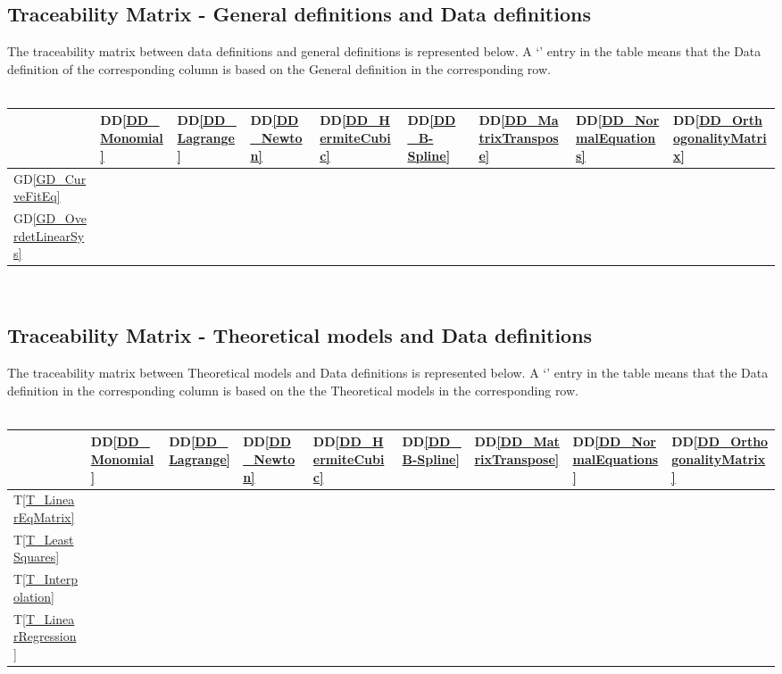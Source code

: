 \documentclass[12pt]{article}
\newcommand{\dref}[1]{GD\ref{#1}}
\newcommand{\ddref}[1]{DD\ref{#1}}
\newcommand{\tref}[1]{T\ref{#1}}
\begin{document}
\subsection{Traceability Matrix - General definitions and Data definitions}
The traceability matrix between data definitions and general definitions is represented below. A `\checkmark' entry in the table means that the Data definition of the corresponding column is based on the General definition in the corresponding row.\\
~\newline
\begin{tabular}{|p{1.3cm}|p{1cm}|p{1cm}|p{1cm}|p{1cm}|p{1cm}|p{1cm}|p{1cm}|p{1cm}|}
	
	\hline
	 & \ddref{DD_Monomial} & \ddref{DD_Lagrange} & \ddref{DD_Newton} & \ddref{DD_HermiteCubic} & \ddref{DD_B-Spline} & \ddref{DD_MatrixTranspose}  & \ddref{DD_NormalEquations} & \ddref{DD_OrthogonalityMatrix}\\
	 \hline
	 \dref{GD_CurveFitEq} & \checkmark & \checkmark  & \checkmark  & \checkmark  & \checkmark  & \checkmark   & \checkmark & \checkmark\\
	  \hline
	 \dref{GD_OverdetLinearSys} &  &   &   &   &   & \checkmark   & \checkmark & \checkmark \\
	 
	\hline
	
\end{tabular}\\

\subsection{Traceability Matrix - Theoretical models and Data definitions}
The traceability matrix between Theoretical models and Data definitions is represented below. A `\checkmark' entry in the table means that the Data definition in the corresponding column is based on the the Theoretical models in the corresponding row.\\
~\newline
\begin{tabular}{|p{1.3cm}|p{1cm}|p{1cm}|p{1cm}|p{1cm}|p{1cm}|p{1cm}|p{1cm}|p{1cm}|}
	
	\hline
	& \ddref{DD_Monomial} & \ddref{DD_Lagrange} & \ddref{DD_Newton} & \ddref{DD_HermiteCubic} & \ddref{DD_B-Spline} & \ddref{DD_MatrixTranspose}  & \ddref{DD_NormalEquations} & \ddref{DD_OrthogonalityMatrix}\\
	\hline
	\tref{T_LinearEqMatrix} & \checkmark & \checkmark  & \checkmark  & \checkmark  &   & \checkmark   & \checkmark & \checkmark\\
	\hline
	\tref{T_LeastSquares} &  &   &   &   &   & \checkmark   & \checkmark & \checkmark \\
	\hline
	\tref{T_Interpolation} & \checkmark & \checkmark  & \checkmark  & \checkmark  & \checkmark  &    &  &  \\
	\hline
	\tref{T_LinearRegression} &  &   &   &   &   & \checkmark   & \checkmark & \checkmark \\
	\hline
\end{tabular}\\
\end{document}
